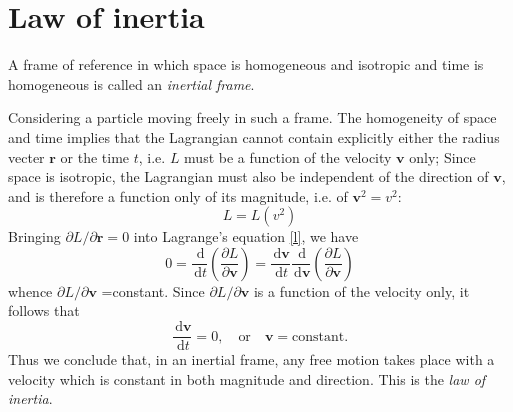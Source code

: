 \documentclass{article}
\newcommand{\be}{\begin{equation}}
\newcommand{\ee}{\end{equation}}
\newcommand{\dif}{\,\mathrm{d}}
\begin{document}
\section{Law of inertia}
A frame of reference in which space is homogeneous and isotropic and time is homogeneous is called an \emph{inertial frame}.

Considering a particle moving freely in such a frame. The homogeneity of space and time implies that the Lagrangian cannot contain explicitly either the radius vecter $\bm{r}$ or the time $t$, i.e. $L$ must be a function of the velocity $\bm{v}$ only; Since space is isotropic, the Lagrangian must also be independent of the direction of $\bm{v}$, and is therefore a function only of its magnitude, i.e. of $\bm{v}^2=v^2$:
\be 
L=L(v^2)
\ee
Bringing $\partial L/\partial \bm{r}=0$ into Lagrange's equation \eqref{l}, we have
\be 
0=\frac{\dif}{\dif t}\left(\frac{\partial L}{\partial \bm{v}}\right)=\frac{\dif \bm v}{\dif t}\frac{\dif}{\dif \bm{v}}\left(\frac{\partial L}{\partial \bm{v}}\right)
\ee
whence $\partial L/\partial \bm{v}$ =constant. Since $\partial L/\partial \bm v$ is a function of the velocity only, it follows that 
\be 
\frac{\dif \bm v}{\dif t}=0, \quad\mbox{or} \quad\bm v=\mbox{constant}.
\ee
Thus we conclude that, in an inertial frame, any free motion takes place with a velocity which is constant in both magnitude and direction. This is the \emph{law of inertia}.
\end{document}
